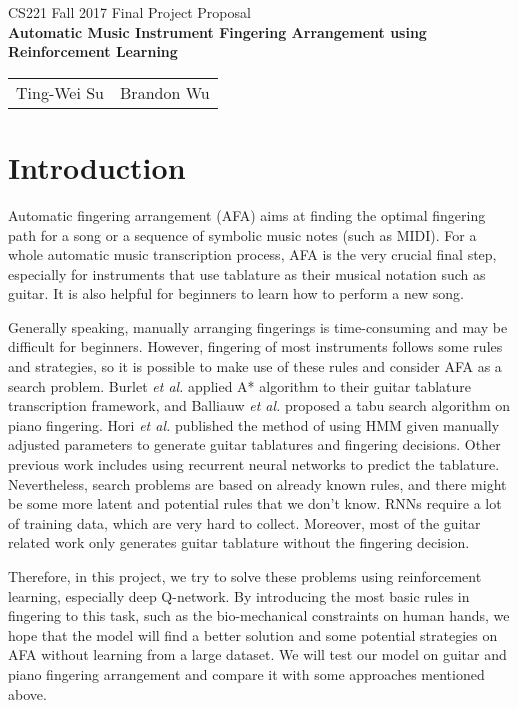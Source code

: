 \documentclass[12pt]{article}
\begin{document}
\begin{center}
{\Large CS221 Fall 2017 Final Project Proposal\\}
{\Large \textbf{Automatic Music Instrument Fingering Arrangement using Reinforcement Learning}}

\begin{tabular}{ll}
Ting-Wei Su & Brandon Wu \\
\end{tabular}
\end{center}

\section*{Introduction}

Automatic fingering arrangement (AFA) aims at finding the optimal fingering path for a song or a sequence of symbolic music notes (such as MIDI). 
For a whole automatic music transcription process, AFA is the very crucial final step, especially for instruments that use tablature as their musical notation such as guitar. It is also helpful for beginners to learn how to perform a new song. 

Generally speaking, manually arranging fingerings is time-consuming and may be difficult for beginners. 
However, fingering of most instruments follows some rules and strategies, so it is possible to make use of these rules and consider AFA as a search problem. Burlet \textit{et al.}\cite{burlet2013robotaba} applied A* algorithm to their guitar tablature transcription framework, and Balliauw \textit{et al.}\cite{balliauw2015generating} proposed a tabu search algorithm on piano fingering. Hori \textit{et al.}\cite{hori2013input} published the method of using HMM given manually adjusted parameters to generate guitar tablatures and fingering decisions.
Other previous work includes using recurrent neural networks to predict the tablature\cite{mistler2017thesis}. 
Nevertheless, search problems are based on already known rules, and there might be some more latent and potential rules that we don't know. RNNs require a lot of training data, which are very hard to collect. Moreover, most of the guitar related work only generates guitar tablature without the fingering decision.

Therefore, in this project, we try to solve these problems using reinforcement learning, especially deep Q-network. By introducing the most basic rules in fingering to this task, such as the bio-mechanical constraints on human hands, we hope that the model will find a better solution and some potential strategies on AFA without learning from a large dataset. We will test our model on guitar and piano fingering arrangement and compare it with some approaches mentioned above.
\end{document}
